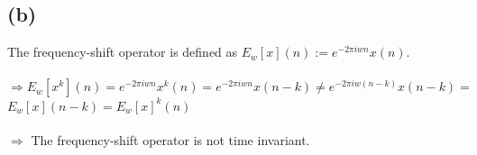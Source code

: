 \documentclass[12pt]{article}
\begin{document}
\subsection*{(b)}
The frequency-shift operator is defined as $E_{w}[x](n):=e^{-2\pi iwn}x(n)$.\\\\
$\Rightarrow E_{w}[x^{k}](n)=e^{-2\pi iwn}x^{k}(n) = e^{-2\pi iwn}x(n-k) \neq e^{-2\pi iw(n-k)}x(n-k) =$\\ $E_{w}[x](n-k) = E_{w}[x]^{k}(n)$\\\\
$\Rightarrow$ The frequency-shift operator is not time invariant.
 
\end{document}
